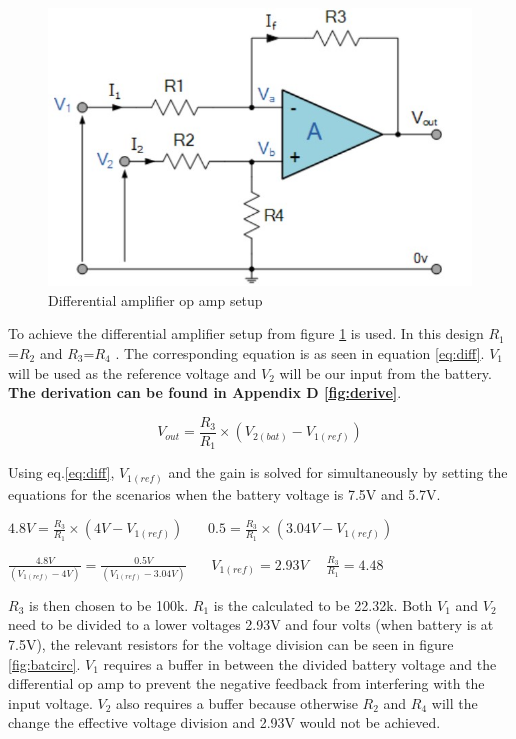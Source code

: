 \begin{figure}[!htb]
	\centering
	\includegraphics[width=0.27\linewidth]{Figures/A6/difamp.jpg}
	\caption[Differential amplifier op amp setup]{Differential amplifier op amp setup\cite{difAmp} }
	\label{fig:difamp}
\end{figure}

To achieve the differential amplifier setup from figure \ref{fig:difamp} is used. In this design $R_1$=$R_2$ and $R_3$=$R_4$ \cite{difAmp}. The corresponding equation is as seen in equation \ref{eq:diff}.  $V_1$ will be used as the reference voltage and $V_2$ will be our input from the battery. \textbf{The derivation can be found in Appendix D \ref{fig:derive}}.

\begin{equation}
	V_{out}=\frac{R_3}{R_1}\times(V_{2(bat)}-V_{1(ref)}) 
	\label{eq:diff}
\end{equation}

Using eq.\ref{eq:diff}, $V_{1(ref)}$ and the gain is solved for simultaneously by setting the equations for the scenarios when the battery voltage is 7.5V and 5.7V.

\begin{center}
	 $4.8V=\frac{R_3}{R_1}\times(4V-V_{1(ref)}) \ \ \ \ \ \ \ \ 0.5=\frac{R_3}{R_1}\times(3.04V-V_{1(ref)}) $\newline 
	
	$\frac{4.8V}{(V_{1(ref)}-4V)}=\frac{0.5V}{(V_{1(ref)}-3.04V)}  \ \ \ \ \ \ \ \ V_{1(ref)}=2.93V \ \ \ \ \ \ \frac{R_3}{R_1}=4.48$\newline
\end{center}


$R_3$ is then chosen to be 100k\textohm. $R_1$ is the calculated to be 22.32k\textohm. Both $V_1$ and $V_2$ need to be divided to a lower voltages 2.93V and four volts (when battery is at 7.5V), the relevant resistors for the voltage division can be seen in figure \ref{fig:batcirc}.  $V_1$ requires a buffer in between the divided battery voltage and the differential op amp to prevent the negative feedback from interfering with the input voltage. $V_2$ also requires a buffer because otherwise $R_2$ and $R_4$ will the change the effective voltage division and 2.93V would not be achieved. 

